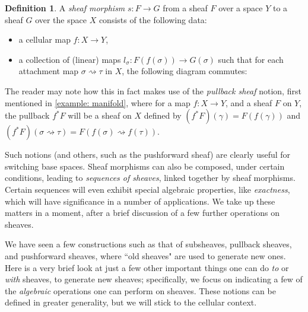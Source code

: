 \documentclass[11pt]{book}
\theoremstyle{definition}
\theoremstyle{definition}
\newtheorem{definition}{Definition}[section]
\theoremstyle{definition}
\theoremstyle{theorem}
\theoremstyle{definition}
\begin{document}
		\begin{definition}
			A \textit{sheaf morphism} $s: F \rightarrow G$ from a sheaf $F$ over a space $Y$ to a sheaf $G$ over the space $X$ consists of the following data: 
			\begin{itemize}
				\item a cellular map $f: X \rightarrow Y$, 
				\item a collection of (linear) maps $l_{\sigma}: F(f(\sigma)) \rightarrow G(\sigma)$ such that for each attachment map $\sigma \rightsquigarrow \tau$ in $X$, the following diagram commutes: 
					\begin{center}  
				\end{center}  
			\end{itemize}
		\end{definition} \noindent 
	The reader may note how this in fact makes use of the \textit{pullback sheaf} notion, first mentioned in \ref{example: manifold}, where for a map $f: X \rightarrow Y$, and a sheaf $F$ on $Y$, the pullback $f^*F$ will be a sheaf on $X$ defined by $(f^*F)(\gamma) = F(f(\gamma))$ and $(f^*F)(\sigma \rightsquigarrow \tau) = F(f(\sigma) \rightsquigarrow f(\tau))$. \par 
	Such notions (and others, such as the pushforward sheaf) are clearly useful for switching base spaces. Sheaf morphisms can also be composed, under certain conditions, leading to \textit{sequences of sheaves}, linked together by sheaf morphisms. Certain sequences will even exhibit special algebraic properties, like \textit{exactness}, which will have significance in a number of applications. We take up these matters in a moment, after a brief discussion of a few further operations on sheaves. \par 
	We have seen a few constructions such as that of subsheaves, pullback sheaves, and  pushforward sheaves, where ``old sheaves" are used to generate new ones. Here is a very brief look at just a few other important things one can do \textit{to} or \textit{with} sheaves, to generate new sheaves; specifically, we focus on indicating a few of the \textit{algebraic} operations one can perform on sheaves. These notions can be defined in greater generality, but we will stick to the cellular context. 
\end{document}
